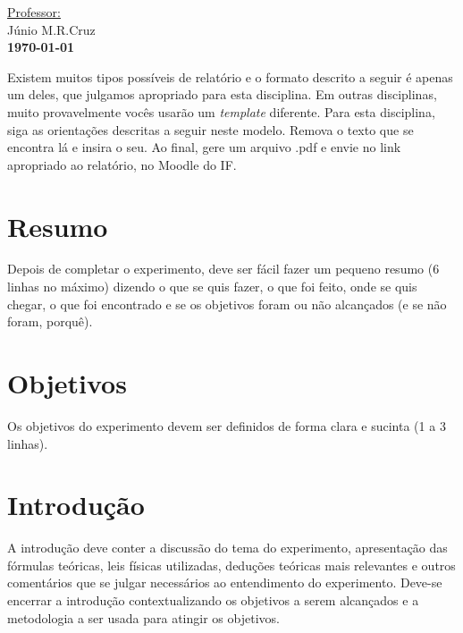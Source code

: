 \documentclass[a4paper]{article}
\begin{document}
\begin{titlepage}
\begin{center}
        \vspace{25pt}
        \hfill \underline{Professor:}\\
        \hfill Júnio M.R.Cruz\\ %
        
        
        \vspace{\fill}
        \LARGE \bf{\today}
          
	\end{center}
\end{titlepage}



\newpage

{}
\large
Existem muitos tipos possíveis de relatório e o formato descrito a seguir é apenas um deles, que julgamos apropriado para esta disciplina. Em outras disciplinas, muito provavelmente vocês usarão um \textit{template} diferente. Para esta disciplina, siga as orientações descritas a seguir neste modelo. Remova o texto que se encontra lá e insira o seu. Ao final, gere um arquivo .pdf e envie no link apropriado ao relatório, no Moodle do IF.
\section{Resumo}
Depois de completar o experimento, deve ser fácil fazer um pequeno resumo (6 linhas no máximo) dizendo o que se quis fazer, o que foi feito, onde se quis chegar, o que foi encontrado e se os objetivos foram ou não alcançados (e se não foram, porquê).
\section{Objetivos}
Os objetivos do experimento devem ser definidos de forma clara e sucinta (1 a 3 linhas).
\section{Introdução}
A introdução deve conter a discussão do tema do experimento, apresentação das fórmulas teóricas, leis físicas utilizadas, deduções teóricas mais relevantes e outros comentários que se julgar necessários ao entendimento do experimento. Deve-se encerrar a introdução contextualizando os objetivos a serem alcançados e a metodologia a ser usada para atingir os objetivos.
\end{document}
